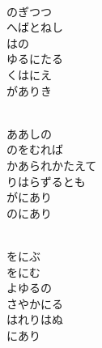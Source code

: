 \documentclass[10pt,b5j]{tarticle} %
\begin{document}
\vspace{1.5em} %
\newcommand{\linespace}{0.5em} %
\newcommand{\blocksize}{0.5\hsize} %
\newcommand{\itemmargin}{6em} %
\begin{enumerate} %
    \setlength{\itemindent}{\itemmargin} %
    \begin{minipage}[c]{\blocksize}
    
        \vspace{\linespace}
        \item~\\
        のぎつつ\\
        へばとねし\\
        はの\\
        ゆるにたる\\
        くはにえ\\
        がありき
        
        \vspace{\linespace}
        \item~\\
        ああしの\\
        のをむれば\\
        かあられかたえて\\
        りはらずるとも\\
        がにあり\\
        のにあり
        
        \vspace{\linespace}
        \item~\\
        をにぶ\\
        をにむ\\
        よゆるの\\
        さやかにる\\
        はれりはぬ\\
        にあり
        

\end{minipage}
\end{enumerate}
\end{document}
